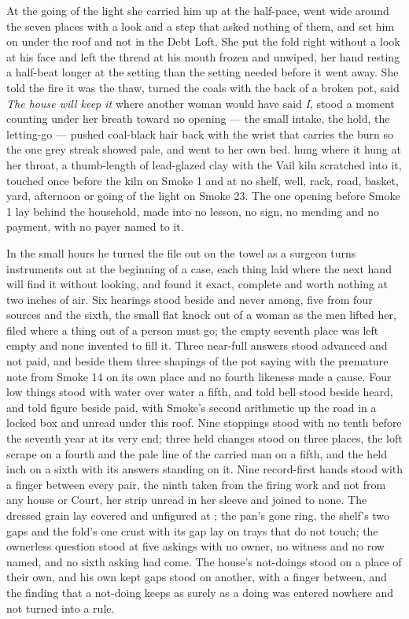 At the going of the light she carried him up at the half-pace, went wide around the seven places with a look and a step that asked nothing of them, and set him on  under the roof and not in the Debt Loft. She put the fold right without a look at his face and left the thread at his mouth frozen and unwiped, her hand resting a half-beat longer at the setting than the setting needed before it went away. She told the fire it was the thaw, turned the coals with the back of a broken pot, said \emph{The house will keep it} where another woman would have said \emph{I}, stood a moment counting under her breath toward no opening --- the small intake, the hold, the letting-go --- pushed coal-black hair back with the wrist that carries the burn so the one grey streak showed pale, and went to her own bed.  hung where it hung at her throat, a thumb-length of lead-glazed clay with the Vail kiln scratched into it, touched once before the kiln on Smoke 1 and at no shelf, well, rack, road, basket, yard, afternoon or going of the light on Smoke 23. The one opening before Smoke 1 lay behind the household, made into no lesson, no sign, no mending and no payment, with no payer named to it.

In the small hours he turned the file out on the towel as a surgeon turns instruments out at the beginning of a case, each thing laid where the next hand will find it without looking, and found it exact, complete and worth nothing at two inches of air. Six hearings stood beside and never among, five from four sources and the sixth, the small flat knock out of a woman as the men lifted her, filed where a thing out of a person must go; the empty seventh place was left empty and none invented to fill it. Three near-full answers stood advanced and not paid, and beside them three shapings of the pot saying with the premature note from Smoke 14 on its own place and no fourth likeness made a cause. Four low things stood with water over water a fifth, and told bell stood beside heard, and told figure beside paid, with Smoke's second arithmetic up the road in a locked box and unread under this roof. Nine stoppings stood with no tenth before the seventh year at its very end; three held changes stood on three places, the loft scrape on a fourth and the pale line of the carried man on a fifth, and the held inch on a sixth with its answers standing on it. Nine record-first hands stood with a finger between every pair, the ninth taken from the firing work and not from any house or Court, her strip unread in her sleeve and joined to none. The dressed grain lay covered and unfigured at ; the pan's gone ring, the shelf's two gaps and the fold's one crust with its gap lay on trays that do not touch; the ownerless question stood at five askings with no owner, no witness and no row named, and no sixth asking had come. The house's not-doings stood on a place of their own, and his own kept gaps stood on another, with a finger between, and the finding that a not-doing keeps as surely as a doing was entered nowhere and not turned into a rule.

